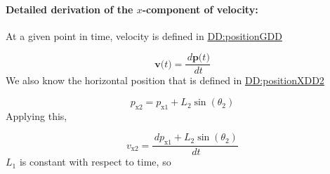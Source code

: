 \documentclass[12pt]{article}
\begin{document}
\paragraph{Detailed derivation of the $x$-component of velocity:}
\label{GD:velocityX2Deriv}
At a given point in time, velocity is defined in \hyperref[DD:positionGDD]{DD:positionGDD}

\begin{displaymath}
\symbf{v}\text{(}t\text{)}=\frac{\,d\symbf{p}\text{(}t\text{)}}{\,dt}
\end{displaymath}
We also know the horizontal position that is defined in \hyperref[DD:positionXDD2]{DD:positionXDD2}

\begin{displaymath}
{p_{\text{x}2}}={p_{\text{x}1}}+{L_{2}} \sin\left({θ_{2}}\right)
\end{displaymath}
Applying this,

\begin{displaymath}
{v_{\text{x}2}}=\frac{\,d{p_{\text{x}1}}+{L_{2}} \sin\left({θ_{2}}\right)}{\,dt}
\end{displaymath}
${L_{1}}$ is constant with respect to time, so
\end{document}
